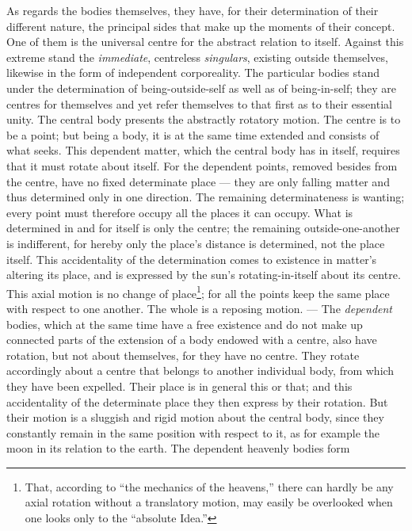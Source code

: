 \documentclass[12pt,a4paper]{book}
\begin{document}
As regards the bodies themselves, they have, for their
determination of their different nature, the principal sides that make up the moments of their concept.
One of them is the universal centre for the abstract relation to itself. Against this extreme stand the
\emph{immediate}, centreless \emph{singulars}, existing outside themselves, likewise in the form of
independent corporeality. The particular bodies stand under the determination of being-outside-self as well
as of being-in-self; they are centres for themselves and yet refer themselves to that first as to their
essential unity. The central body presents the abstractly rotatory motion. The centre is to be a point; but
being a body, it is at the same time extended and consists of what seeks. This dependent matter, which the
central body has in itself, requires that it must rotate about itself. For the dependent points, removed
besides from the centre, have no fixed determinate place --- they are only falling matter and thus
determined only in one direction. The remaining determinateness is wanting; every point must therefore
occupy all the places it can occupy. What is determined in and for itself is only the centre; the remaining
outside-one-another is indifferent, for hereby only the place's distance is determined, not the place
itself. This accidentality of the determination comes to existence in matter's altering its place, and is
expressed by the sun's rotating-in-itself about its centre. This axial motion is no change of
place\footnote{%
That, according to ``the mechanics of the heavens,'' there can hardly be any axial rotation without a
translatory motion, may easily be overlooked when one looks only to the ``absolute Idea.''}; for all the
points keep the same place with respect to one another. The whole is a reposing motion. --- The
\emph{dependent} bodies, which at the same time have a free existence and do not make up connected parts of
the extension of a body endowed with a centre, also have rotation, but not about themselves, for they have
no centre. They rotate accordingly about a centre that
belongs to another individual body, from which they have been expelled. Their place is in general this or
that; and this accidentality of the determinate place they then express by their rotation. But their motion
is a sluggish and rigid motion about the central body, since they constantly remain in the same position
with respect to it, as for example the moon in its relation to the earth. The dependent heavenly bodies form
\end{document}
